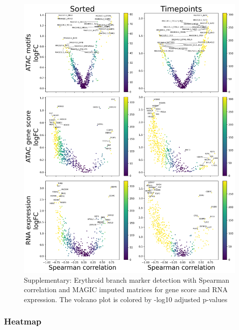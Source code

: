 \documentclass[a4paper]{article}
\begin{document}
\begin{figure}[!htb]
  \centering
  \includegraphics[width=\textwidth]{../figures/hematopoiesis/Neutrophil_40_106_smooth_magic_single_branch_volcanos_motifs.png}
  \caption{Supplementary: Erythroid branch marker detection with Spearman correlation and MAGIC imputed matrices for gene score and RNA expression. The volcano plot is colored by -log10 adjusted p-values}
\end{figure}

\FloatBarrier
\subsubsection{Heatmap}
\end{document}
